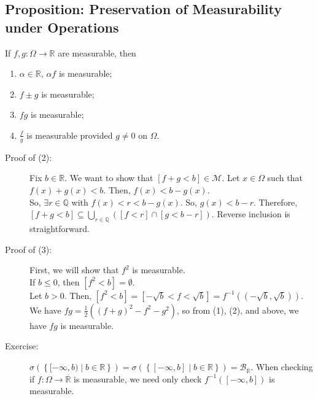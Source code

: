 \documentclass[10pt]{extarticle}
\newcommand{\Q}{\mathbb{Q}}
\newcommand{\R}{\mathbb{R}}
\begin{document}
  \subsection{Proposition: Preservation of Measurability under Operations}%
  If $f,g: \Omega \rightarrow \R$ are measurable, then
  \begin{enumerate}[(1)]
    \item $\alpha \in \R$, $\alpha f$ is measurable;
    \item $f\pm g$ is measurable;
    \item $fg$ is measurable;
    \item $\frac{f}{g}$ is measurable provided $g\neq 0$ on $\Omega$.
  \end{enumerate}
  \begin{description}
    \item[Proof of (2):] Fix $b\in \R$. We want to show that $[f+g < b]\in \mathcal{M}$. Let $x\in \Omega$ such that $f(x) + g(x) < b$. Then, $f(x) < b-g(x)$.\\

      So, $\exists r\in\Q$ with $f(x) < r < b-g(x)$. So, $g(x) < b - r$. Therefore, $[f + g < b] \subseteq \bigcup_{r\in \Q}\left([f < r]\cap [g < b - r]\right)$. Reverse inclusion is straightforward.
    \item[Proof of (3):] First, we will show that $f^{2}$ is measurable.\\

      If $b \leq 0$, then $[f^2 < b] = \emptyset$.\\

      Let $b > 0$. Then, $[f^2 < b] = [-\sqrt{b} < f < \sqrt{b}] = f^{-1}\left((-\sqrt{b},\sqrt{b})\right)$.\\

      We have $fg = \frac{1}{2}\left((f+g)^2 - f^2 - g^2\right)$, so from (1), (2), and above, we have $fg$ is measurable.
    \item[Exercise:] $\sigma\left(\left\{[-\infty,b)\mid b\in\R\right\}\right) = \sigma\left(\left\{[-\infty,b]\mid b\in\R\right\}\right) = \mathcal{B}_{\overline{\R}}$. When checking if $f: \Omega \rightarrow \overline{\R}$ is measurable, we need only check $f^{-1}([-\infty,b])$ is measurable.
  \end{description}
\end{document}
